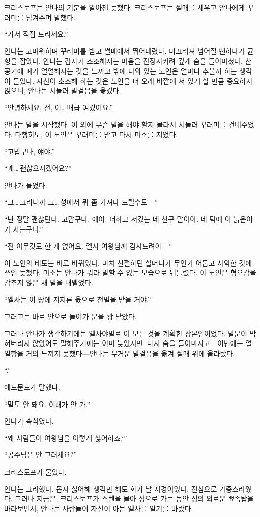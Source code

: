 크리스토프는 안나의 기분을 알아챈 듯했다. 크리스토프는 썰매를 세우고 안나에게 꾸러미를 넘겨주며 말했다.

``가서 직접 드리세요.''

안나는 고마워하며 꾸러미를 받고 썰매에서 뛰어내렸다. 미끄러져 넘어질 뻔하다가 균형을 잡았다. 안나는 갑자기 초조해지는 마음을 진정시키려 깊게 숨을 들이마셨다. 찬 공기에 폐가 얼얼해지는 것을 느끼고 밖에 나와 있는 노인은 얼마나 추울까 하는 생각이 들었다. 자신이 초조해 하는 것은 노인을 더 오래 바깥에 서 있게 할 만큼 중요하지 않으니, 안나는 서둘러 발걸음을 옮겼다.

``안녕하세요, 전, 어\ldots\,배급 여깄어요.''

안나는 말을 시작했다. 이 외에 무슨 말을 해야 할지 몰라서 서둘러 꾸러미를 건네주었다. 다행히도, 이 노인은 꾸러미를 받고 다시 미소를 지었다.

``고맙구나, 얘야.''

``괘\ldots\,괜찮으시겠어요?''

안나가 물었다.

``그\ldots\,그러니까 그\ldots\,성에서 뭐 좀 가져다 드릴수도—''

``난 정말 괜찮단다. 고맙구나, 얘야. 너하고 저깄는 네 친구 말이야. 네 덕에 이 늙은이가 사는구나.''

``전 아무것도 한 게 없어요. 엘사 여왕님께 감사드려야—''

이 노인의 태도는 바로 바뀌었다. 마치 친절하던 할머니가 무언가 어둡고 사악한 것에 쓰인 듯했다. 미소는 안나가 뭐라 말할 수 없는 모습으로 뒤틀렸다. 이 노인은 혐오감을 감추지 않은 채 말을 내뱉었다.

``엘사는 이 땅에 저지른 옰으로 천벌을 받을 거야.''

그러고는 바로 안으로 들어가 문을 쾅 닫았다.

그러나 안나가 생각하기에는 엘사야말로 이 모든 것을 계획한 장본인이었다. 말문이 막혀버리지 않았어도 말해주기에는 이미 늦었지만. 다시 숨을 들이마시고—이번에는 얼얼함을 거의 느끼지 못했다—안나는 무거운 발걸음을 옮겨 썰매 위에 올라탔다.

``.''

에드문드가 말했다.

``말도 안 돼요. 이해가 안 가.''

안나가 속삭였다.

``왜 사람들이 여왕님을 이렇게 싫어하죠?''

``공주님은 안 그러세요?''

크리스토프가 물었다.

안나는 그러했다. 몹시 싫어해 생각만 해도 화가 날 지경이었다. 진심으로 가증스러웠다. 그러나 지금은, 크리스토프가 스벤을 몰아 성으로 가는 동안 성의 외로운 뾰족탑을 바라보면서, 안나는 사람들이 자신이 아는 엘사를 알기를 바랐다.

